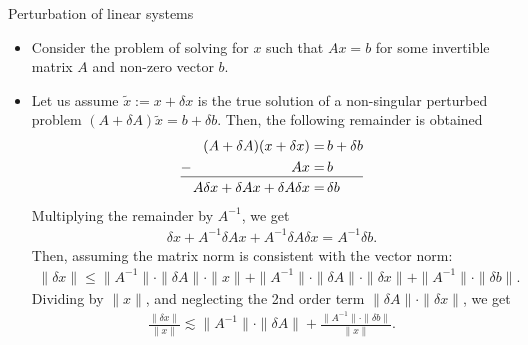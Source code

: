 \documentclass[t,usepdftitle=false]{beamer}
\begin{document}
\begin{frame}{Perturbation of linear systems}
\begin{itemize}
\item Consider the problem of solving for $x$ such that $Ax=b$ for some invertible matrix $A$ and non-zero vector $b$.
\item Let us assume $\tilde{x}:=x+\delta x$ is the true solution of a non-singular perturbed problem $(A+\delta A)\tilde{x}=b+\delta b$. 
Then, the following remainder is obtained\vspace{-.1cm}
\begin{equation*}
\begin{split}
(A+\delta A)(x+\delta x)=&\,b+\delta b\\
-\hspace{2.5cm}Ax=&\,b\\
\hline
A\delta x+\delta Ax+\delta A\delta x=&\,\delta b\vphantom{A^{A^I}}
\end{split}
\end{equation*}
Multiplying the remainder by $A^{-1}$, we get
\begin{align*}
\delta x+A^{-1}\delta Ax+A^{-1}\delta A\delta x=A^{-1}\delta b.
\end{align*}
Then, assuming the matrix norm is consistent with the vector norm:
\begin{align*}
\|\delta x\|\leq 
\|A^{-1}\|\cdot\|\delta A\|\cdot\|x\|
+\|A^{-1}\|\cdot\|\delta A\|\cdot\|\delta x\|
+\|A^{-1}\|\cdot\|\delta b\|.
\end{align*}
Dividing by $\|x\|$, and neglecting the 2nd order term $\|\delta A\|\cdot\|\delta x\|$, we get
\begin{align*}
\frac{\|\delta x\|}{\|x\|}\lesssim
\|A^{-1}\|\cdot\|\delta A\|
+\frac{\|A^{-1}\|\cdot\|\delta b\|}{\|x\|}.
\end{align*}
\end{itemize}
\end{frame}
\end{document}

